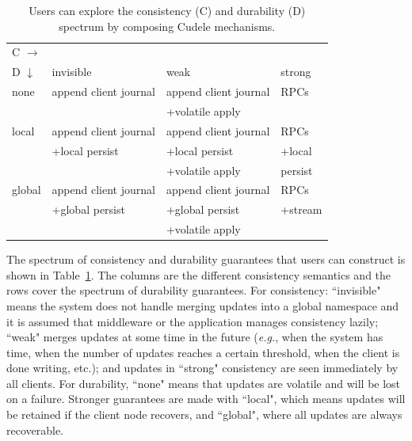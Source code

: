 \begin{table}[t]
\begin{center}
\begin{tabular}{ l | l | l | l }
  C \(\rightarrow\) &&& \\  
  D \(\downarrow\)  	     & invisible         & weak        & strong  \\\hline
  none                       & append client journal            & append client journal          & RPCs    \\
                             &                   & +volatile apply &         \\\hdashline
  local                      & append client journal            & append client journal          & RPCs    \\
                             & +local persist    & +local persist  & +local  \\
                             &                   & +volatile apply &  persist\\\hdashline
  global                     & append client journal            & append client journal          & RPCs    \\
                             & +global persist   & +global persist & +stream \\
                             &                   & +volatile apply &         \\
\end{tabular}

\caption{Users can explore the consistency (C) and
durability (D) spectrum by composing Cudele mechanisms. 
\label{table:spectrum}}
\end{center}
\end{table}



The spectrum of consistency and durability guarantees that users can
construct is shown in Table~\ref{table:spectrum}. The columns are the different
consistency semantics and the rows cover the spectrum of durability guarantees.
For consistency: ``invisible" means the system does not handle merging updates
into a global namespace and it is assumed that middleware or the application
manages consistency lazily; ``weak" merges updates at some time in the
future ({\it e.g.}, when the system has time, when the number of updates reaches a
certain threshold, when the client is done writing, etc.); and updates in
``strong" consistency are seen immediately by all clients. For durability,
``none" means that updates are volatile and will be lost on a failure. Stronger
guarantees are made with ``local", which means updates will be retained if the
client node recovers, and ``global", where all updates are always recoverable.

